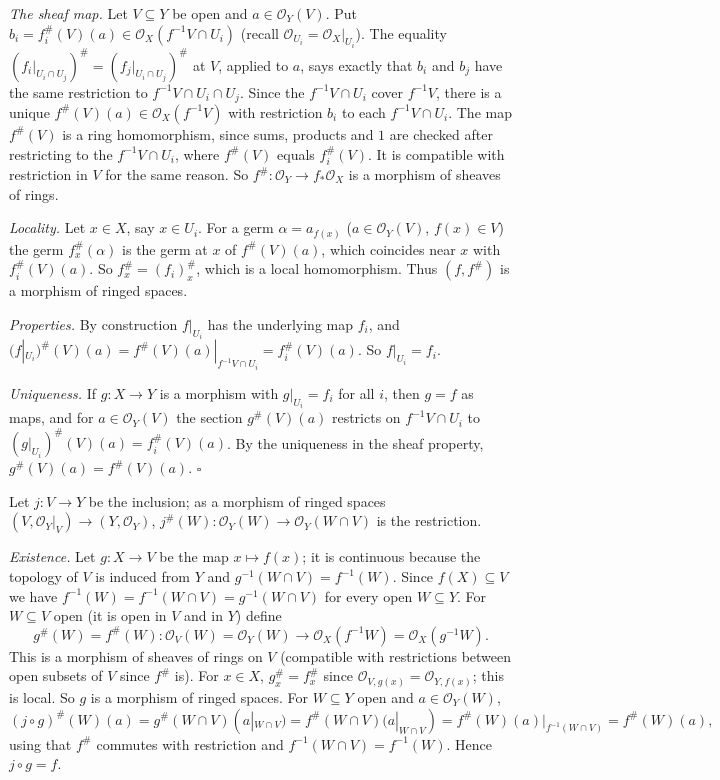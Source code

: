 \documentclass[11pt]{article}
\begin{document}
\emph{The sheaf map.} Let $V\subseteq Y$ be open and $a\in\mathcal{O}_Y(V)$. Put $b_i=f_i^\#(V)(a)\in\mathcal{O}_X(f^{-1}V\cap U_i)$ (recall $\mathcal{O}_{U_i}=\mathcal{O}_X|_{U_i}$). The equality $(f_i|_{U_i\cap U_j})^\#=(f_j|_{U_i\cap U_j})^\#$ at $V$, applied to $a$, says exactly that $b_i$ and $b_j$ have the same restriction to $f^{-1}V\cap U_i\cap U_j$. Since the $f^{-1}V\cap U_i$ cover $f^{-1}V$, there is a unique $f^\#(V)(a)\in\mathcal{O}_X(f^{-1}V)$ with restriction $b_i$ to each $f^{-1}V\cap U_i$. The map $f^\#(V)$ is a ring homomorphism, since sums, products and $1$ are checked after restricting to the $f^{-1}V\cap U_i$, where $f^\#(V)$ equals $f_i^\#(V)$. It is compatible with restriction in $V$ for the same reason. So $f^\#:\mathcal{O}_Y\to f_*\mathcal{O}_X$ is a morphism of sheaves of rings.

\emph{Locality.} Let $x\in X$, say $x\in U_i$. For a germ $\alpha=a_{f(x)}$ ($a\in\mathcal{O}_Y(V)$, $f(x)\in V$) the germ $f_x^\#(\alpha)$ is the germ at $x$ of $f^\#(V)(a)$, which coincides near $x$ with $f_i^\#(V)(a)$. So $f^\#_x=(f_i)^\#_x$, which is a local homomorphism. Thus $(f,f^\#)$ is a morphism of ringed spaces.

\emph{Properties.} By construction $f|_{U_i}$ has the underlying map $f_i$, and $(f|_{U_i})^\#(V)(a)=f^\#(V)(a)|_{f^{-1}V\cap U_i}=f_i^\#(V)(a)$. So $f|_{U_i}=f_i$.

\emph{Uniqueness.} If $g:X\to Y$ is a morphism with $g|_{U_i}=f_i$ for all $i$, then $g=f$ as maps, and for $a\in\mathcal{O}_Y(V)$ the section $g^\#(V)(a)$ restricts on $f^{-1}V\cap U_i$ to $(g|_{U_i})^\#(V)(a)=f_i^\#(V)(a)$. By the uniqueness in the sheaf property, $g^\#(V)(a)=f^\#(V)(a)$. \hfill$\square$

\pf
Let $j:V\to Y$ be the inclusion; as a morphism of ringed spaces $(V,\mathcal{O}_Y|_V)\to(Y,\mathcal{O}_Y)$, $j^\#(W):\mathcal{O}_Y(W)\to\mathcal{O}_Y(W\cap V)$ is the restriction.

\emph{Existence.} Let $g:X\to V$ be the map $x\mapsto f(x)$; it is continuous because the topology of $V$ is induced from $Y$ and $g^{-1}(W\cap V)=f^{-1}(W)$. Since $f(X)\subseteq V$ we have $f^{-1}(W)=f^{-1}(W\cap V)=g^{-1}(W\cap V)$ for every open $W\subseteq Y$. For $W\subseteq V$ open (it is open in $V$ and in $Y$) define
\[ g^\#(W)=f^\#(W):\mathcal{O}_V(W)=\mathcal{O}_Y(W)\to\mathcal{O}_X(f^{-1}W)=\mathcal{O}_X(g^{-1}W). \]
This is a morphism of sheaves of rings on $V$ (compatible with restrictions between open subsets of $V$ since $f^\#$ is). For $x\in X$, $g^\#_x=f^\#_x$ since $\mathcal{O}_{V,g(x)}=\mathcal{O}_{Y,f(x)}$; this is local. So $g$ is a morphism of ringed spaces. For $W\subseteq Y$ open and $a\in\mathcal{O}_Y(W)$,
\[ (j\circ g)^\#(W)(a)=g^\#(W\cap V)(a|_{W\cap V})=f^\#(W\cap V)(a|_{W\cap V})=f^\#(W)(a)|_{f^{-1}(W\cap V)}=f^\#(W)(a), \]
using that $f^\#$ commutes with restriction and $f^{-1}(W\cap V)=f^{-1}(W)$. Hence $j\circ g=f$.
\end{document}
